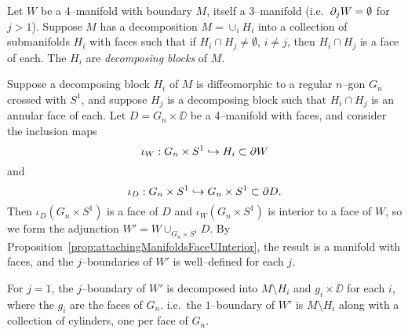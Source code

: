 \begin{ex}
	Let $W$ be a 4--manifold with boundary $M$, itself a 3--manifold  (i.e.\ $ \partial_j W =\emptyset$ for $j>1$).
	Suppose $M$ has a decomposition $M=\cup_i H_i$ into a collection of submanifolds $H_i$ with faces such that if $H_i\cap H_j\neq\emptyset$, $i\neq j$, then $H_i\cap H_j$ is a face of each.
	The $H_i$ are \emph{decomposing blocks} of $M$.
	
	Suppose a decomposing block $H_i$ of $M$ is diffeomorphic to a regular $n$--gon $G_n$ crossed with $S^1$, and suppose $H_j$ is a decomposing block such that $H_i\cap H_j$ is an annular face of each.
	Let $D=G_n\times\DD$ be a 4--manifold with faces, and consider the inclusion maps
	\[
		\iota_W:G_n\times S^1\hookrightarrow H_i\subset \partial W 
	\]
	and
	\[
		\iota_D:G_n\times S^1\hookrightarrow G_n\times S^1\subset \partial D.
	\]
	Then $\iota_D(G_n\times S^1)$ is a face of $D$ and $\iota_W(G_n\times S^1)$ is interior to a face of $W$, so we form the adjunction $W'=W\cup_{G_n\times S^1} D$.
	By Proposition~\ref{prop:attachingManifoldsFaceUInterior}, the result is a manifold with faces, and the $j$--boundaries of $W'$ is well--defined for each $j$.
	
	For $j=1$, the $j$--boundary of $W'$ is decomposed into $M\setminus H_i$ and $g_i\times \DD$ for each $i$, where the $g_i$ are the faces of $G_n$.
	i.e.\ the $1$--boundary of $W'$ is $M\setminus H_i$ along with a collection of cylinders, one per face of $G_n$.
\end{ex}
